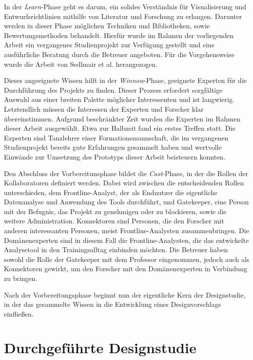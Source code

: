 \documentclass[
  ngerman,
  a4paper,  %
  twoside,  %
  bibliography=totoc,
  headsepline,
  cleardoublepage=empty,
  parskip=half,
  draft=false
]{scrbook}
\begin{document}
In der \textit{Learn}-Phase geht es darum, ein solides Verständnis für Visualisierung und Entwurfsrichtlinien mithilfe von Literatur und Forschung zu erlangen. Darunter werden in dieser Phase möglichen Techniken und Bibliotheken, sowie Bewertungsmethoden behandelt. Hierfür wurde im Rahmen der vorliegenden Arbeit ein vergangenes Studienprojekt zur Verfügung gestellt und eine ausführliche Beratung durch die Betreuer angeboten. Für die Vorgehensweise wurde die Arbeit von Sedlmair et al. \cite{sedlmair_design_2012} herangezogen.

Dieses angeeignete Wissen hilft in der \textit{Winnow}-Phase, geeignete Experten für die Durchführung des Projekts zu finden. Dieser Prozess erfordert sorgfältige Auswahl aus einer breiten Palette möglicher Interessenten und ist langwierig. Letztendlich müssen die Interessen der Experten und Forscher klar übereinstimmen. Aufgrund beschränkter Zeit wurden die Experten im Rahmen dieser Arbeit ausgewählt. Etwa zur Halbzeit fand ein erstes Treffen statt. Die Experten sind Tanzlehrer einer Formationsmannschaft, die im vergangenen Studienprojekt bereits gute Erfahrungen gesammelt haben und wertvolle Einwände zur Umsetzung des Prototyps dieser Arbeit beisteuern konnten.

Den Abschluss der Vorbereitunsphase bildet die \textit{Cast}-Phase, in der die Rollen der Kollaboratoren definiert werden. Dabei wird zwischen die entscheidenden Rollen unterschieden, dem Frontline-Analyst, der als Endnutzer die eigentliche Datenanalyse und Anwendung des Tools durchführt, und Gatekeeper, eine Person mit der Befugnis, das Projekt zu genehmigen oder zu blockieren, sowie die weitere Administration. Konnektoren sind Personen, die den Forscher mit anderen interessanten Personen, meist Frontline-Analysten zusammenbringen. Die Domänenexperten sind in diesem Fall die Frontline-Analysten, die das entwickelte Analysetool in den Trainingsalltag einbinden möchten. Die Betreuer haben sowohl die Rolle der Gatekeeper mit dem Professor eingenommen, jedoch auch als Konnektoren gewirkt, um den Forscher mit den Domänenexperten in Verbindung zu bringen.

Nach der Vorbereitungsphase beginnt nun der eigentliche Kern der Designstudie, in der das gesammelte Wissen in die Entwicklung eines Designvorschlags einfließen.


\section{Durchgeführte Designstudie}
\end{document}
